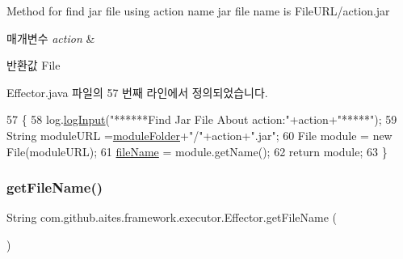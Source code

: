 Method for find jar file using action name jar file name is File\+U\+R\+L/action.\+jar 


\begin{DoxyParams}{매개변수}
{\em action} & \\
\hline
\end{DoxyParams}
\begin{DoxyReturn}{반환값}
File 
\end{DoxyReturn}


Effector.\+java 파일의 57 번째 라인에서 정의되었습니다.


\begin{DoxyCode}
57                                                      \{
58         log.\mbox{\hyperlink{classcom_1_1github_1_1aites_1_1framework_1_1log_1_1_log_writter_ad2c412c85ba5932c7fa4f920c50f44c9}{logInput}}(\textcolor{stringliteral}{"******Find Jar File About action:"}+action+\textcolor{stringliteral}{"*****"});
59         String moduleURL =\mbox{\hyperlink{classcom_1_1github_1_1aites_1_1framework_1_1executor_1_1_effector_abd3712d877c8ff7227be30b6503f2475}{moduleFolder}}+\textcolor{stringliteral}{"/"}+action+\textcolor{stringliteral}{".jar"};
60         File module = \textcolor{keyword}{new} File(moduleURL);
61         \mbox{\hyperlink{classcom_1_1github_1_1aites_1_1framework_1_1executor_1_1_effector_a8df1631ecb6613a1e323f131369cd0b0}{fileName}} = module.getName();
62         \textcolor{keywordflow}{return} module;
63     \}
\end{DoxyCode}
\mbox{\label{classcom_1_1github_1_1aites_1_1framework_1_1executor_1_1_effector_adc2b5fde4f917d55b836591376a75e86}} 
\subsubsection{\texorpdfstring{get\+File\+Name()}{getFileName()}}
{\footnotesize\ttfamily String com.\+github.\+aites.\+framework.\+executor.\+Effector.\+get\+File\+Name (\begin{DoxyParamCaption}{ }\end{DoxyParamCaption})}



